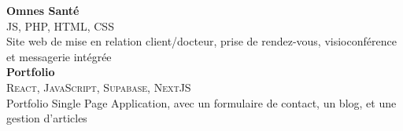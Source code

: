 \documentclass[oneside]{article}
\begin{document}
{\begin{minipage}[t][\dimexpr\textheight-2\fboxrule-2\fboxsep\relax][t]{\dimexpr0.6\textwidth-2\fboxrule-2\fboxsep\relax}
\begin{justify}
        {\large \textbf{Omnes Santé}} \\
        {\scshape{}\selectfont\footnotesize JS, PHP, HTML, CSS} \\
        Site web de mise en relation client/docteur, prise de rendez-vous, visioconférence et messagerie intégrée
        \\[1ex]

        {\large \textbf{Portfolio}} \\
        {\scshape{}\selectfont\footnotesize React, JavaScript, Supabase, NextJS} \\
        Portfolio Single Page Application, avec un formulaire de contact, un blog, et une gestion d'articles
        \\[1ex]
        \end{justify}
    \end{minipage}
}
\end{document}

